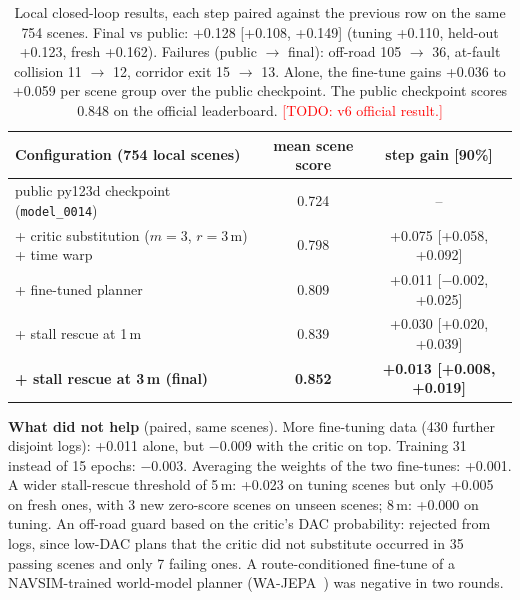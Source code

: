 \documentclass{article}
\newcommand{\todo}[1]{\textcolor{red}{[TODO: #1]}}
\begin{document}
\begin{table}[h]
\centering\small
\begin{tabular}{lcc}
\toprule
Configuration (754 local scenes) & mean scene score & step gain [90\%] \\
\midrule
public py123d checkpoint (\texttt{model\_0014}) & 0.724 & -- \\
+ critic substitution ($m=3$, $r=3$\,m) + time warp & 0.798 & +0.075 [+0.058, +0.092] \\
+ fine-tuned planner & 0.809 & +0.011 [$-$0.002, +0.025] \\
+ stall rescue at 1\,m & 0.839 & +0.030 [+0.020, +0.039] \\
\textbf{+ stall rescue at 3\,m (final)} & \textbf{0.852} & \textbf{+0.013 [+0.008, +0.019]} \\
\bottomrule
\end{tabular}
\caption{Local closed-loop results, each step paired against the previous row on the same 754 scenes. Final vs public:
+0.128 [+0.108, +0.149] (tuning +0.110, held-out +0.123, fresh +0.162). Failures (public $\rightarrow$ final):
off-road 105 $\rightarrow$ 36, at-fault collision 11 $\rightarrow$ 12, corridor exit 15 $\rightarrow$ 13. Alone, the
fine-tune gains +0.036 to +0.059 per scene group over the public checkpoint. The public checkpoint scores 0.848 on the
official leaderboard. \todo{v6 official result.}}
\label{tab:main}
\end{table}

\textbf{What did not help} (paired, same scenes). More fine-tuning data (430 further disjoint logs): +0.011 alone, but
$-$0.009 with the critic on top. Training 31 instead of 15 epochs: $-$0.003. Averaging the weights of the two
fine-tunes: +0.001. A wider stall-rescue threshold of 5\,m: +0.023 on tuning scenes but only +0.005 on fresh ones, with
3 new zero-score scenes on unseen scenes; 8\,m: +0.000 on tuning. An off-road guard based on the critic's DAC probability: rejected from
logs, since low-DAC plans that the critic did not substitute occurred in 35 passing scenes and only 7 failing ones. A
route-conditioned fine-tune of a NAVSIM-trained world-model planner (WA-JEPA~\cite{wajepa}) was negative in two rounds.
\end{document}
